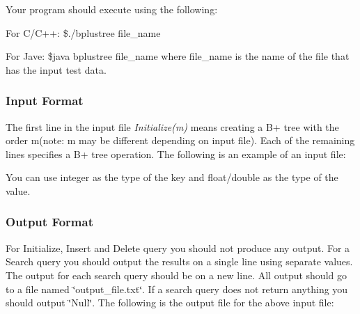 Your program should execute using the following\+:
\begin{DoxyItemize}
\item For C/\+C++\+: \$./bplustree file\+\_\+name
\item For Jave\+: \$java bplustree file\+\_\+name where file\+\_\+name is the name of the file that has the input test data.
\end{DoxyItemize}

\subsubsection*{Input Format}

The first line in the input file {\itshape Initialize(m)} means creating a B+ tree with the order m(note\+: m may be different depending on input file). Each of the remaining lines specifies a B+ tree operation. The following is an example of an input file\+:


\begin{DoxyCode}{0}
\end{DoxyCode}


You can use integer as the type of the key and float/double as the type of the value.

\subsubsection*{Output Format}

For Initialize, Insert and Delete query you should not produce any output. For a Search query you should output the results on a single line using separate values. The output for each search query should be on a new line. All output should go to a file named \char`\"{}output\+\_\+file.\+txt\char`\"{}. If a search query does not return anything you should output \char`\"{}\+Null\char`\"{}. The following is the output file for the above input file\+:


\begin{DoxyCode}{0}
\end{DoxyCode}


